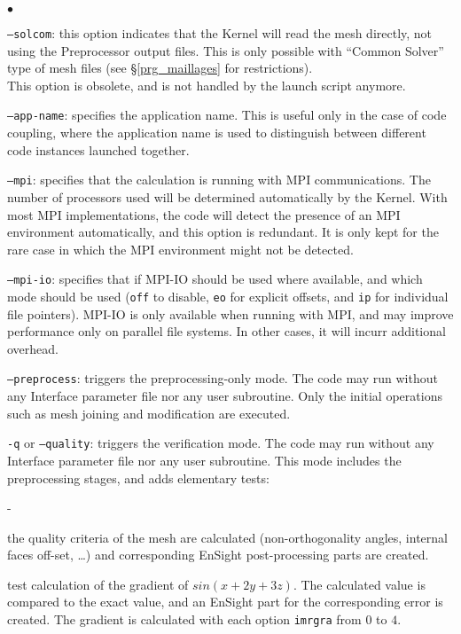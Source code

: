 {{{\begin{list}{$\bullet$}{}
\item \texttt{--solcom}: this option indicates that the Kernel will read the
mesh directly, not using the Preprocessor output files. This is only possible
with ``Common Solver'' type of mesh files (see \S\ref{prg_maillages} for
restrictions).\\
This option is obsolete, and is not handled by the launch script anymore.

\item \texttt{--app-name}: specifies the application name. This is
useful only in the case of code coupling, where the application name
is used to distinguish between different code instances launched together.

\item \texttt{--mpi}: specifies that the calculation is running
with MPI communications. The number of processors used will be determined
automatically by the Kernel. With most MPI implementations, the
code will detect the presence of an MPI environment automatically, and
this option is redundant. It is only kept for the rare case in which the
MPI environment might not be detected.

\item \texttt{--mpi-io}: specifies that if MPI-IO should be used where
available, and which mode should be used (\texttt{off} to disable,
\texttt{eo} for explicit offsets, and \texttt{ip} for individual file
pointers). MPI-IO is only available when running with MPI, and may improve
performance only on parallel file systems. In other cases, it will incurr
additional overhead.

\item \texttt{--preprocess}: triggers the preprocessing-only mode.
The code may run without any Interface parameter file nor any user subroutine.
Only the initial operations such as mesh joining and modification are
executed.

\item \texttt{-q} or \texttt{--quality}: triggers the verification mode.
The code may run without any Interface parameter file nor any user subroutine.
This mode includes the preprocessing stages, and adds elementary tests:\\
\begin{list}{-}{}
\item the quality criteria of the mesh are calculated (non-orthogonality angles,
internal faces off-set, \ldots) and corresponding EnSight
post-processing parts are created.\\
\item test calculation of the gradient of $sin(x+2y+3z)$. The calculated
value is compared to the exact value, and an EnSight part for the
corresponding error is created. The gradient is calculated with each
option \texttt{imrgra} from $0$ to $4$.\\
\end{list}


\end{list}}}}
